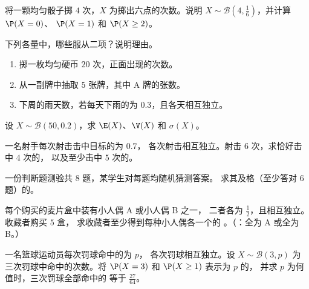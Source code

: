 \begin{exercise}[$\star$]\label{exo:g11:binom:2}
将一颗均匀骰子掷 $4$ 次，$X$ 为掷出六点的次数。说明
$X \sim \mathcal B\left(4, \frac16\right)$，并计算 $\P(X = 0)$、
$\P(X = 1)$ 和 $\P(X \geq 2)$。
\end{exercise}

\begin{exercise}[$\star$]\label{exo:g11:binom:3}
下列各量中，哪些服从二项？说明理由。
\begin{enumerate}
  \item 掷一枚均匀硬币 $20$ 次，正面出现的次数。
  \item 从一副牌中抽取 $5$ 张牌，其中 A 牌的张数。
  \item 下周的雨天数，若每天下雨的为
        $0.3$，且各天相互独立。
\end{enumerate}
\end{exercise}

\begin{exercise}[$\star$]\label{exo:g11:binom:4}
设 $X \sim \mathcal B(50, 0.2)$，求 $\E(X)$、$\V(X)$ 和 $\sigma(X)$。
\end{exercise}

\begin{exercise}[$\star\star$]\label{exo:g11:binom:5}
一名射手每次射击击中目标的为 $0.7$，
各次射击相互独立。射击 $6$ 次，求恰好击中 $4$ 次的，
以及至少击中 $5$ 次的。
\end{exercise}

\begin{exercise}[$\star\star$]\label{exo:g11:binom:6}
一份判断题测验共 $8$ 题，某学生对每题均随机猜测答案。
求其及格（至少答对 $6$ 题）的。
\end{exercise}

\begin{exercise}[$\star\star$]\label{exo:g11:binom:7}
每个购买的麦片盒中装有小人偶 A 或小人偶 B 之一，
二者各为 $\frac12$，且相互独立。收藏者购买 $5$ 盒，
求收藏者至少得到每种小人偶各一个的
。（：全为 A 或全为 B。）
\end{exercise}

\begin{exercise}[$\star\star$]\label{exo:g11:binom:8}
一名篮球运动员每次罚球命中的为 $p$，
各次罚球相互独立。设 $X \sim \mathcal B(3, p)$ 为
三次罚球中命中的次数。将 $\P(X = 3)$ 和 $\P(X \geq 1)$ 表示为 $p$ 的，
并求 $p$ 为何值时，三次罚球全部命中的
等于 $\frac{27}{64}$。
\end{exercise}


